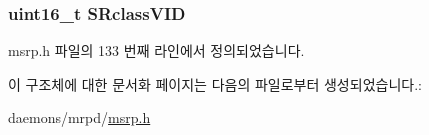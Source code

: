 \subsubsection[{\texorpdfstring{S\+Rclass\+V\+ID}{SRclassVID}}]{\setlength{\rightskip}{0pt plus 5cm}uint16\+\_\+t S\+Rclass\+V\+ID}\hypertarget{structmsrpdu__domain_ac3d5ab67ff0aa5f58fa4dc5057d3ad02}{}\label{structmsrpdu__domain_ac3d5ab67ff0aa5f58fa4dc5057d3ad02}


msrp.\+h 파일의 133 번째 라인에서 정의되었습니다.



이 구조체에 대한 문서화 페이지는 다음의 파일로부터 생성되었습니다.\+:\begin{DoxyCompactItemize}
\item 
daemons/mrpd/\hyperlink{msrp_8h}{msrp.\+h}\end{DoxyCompactItemize}
